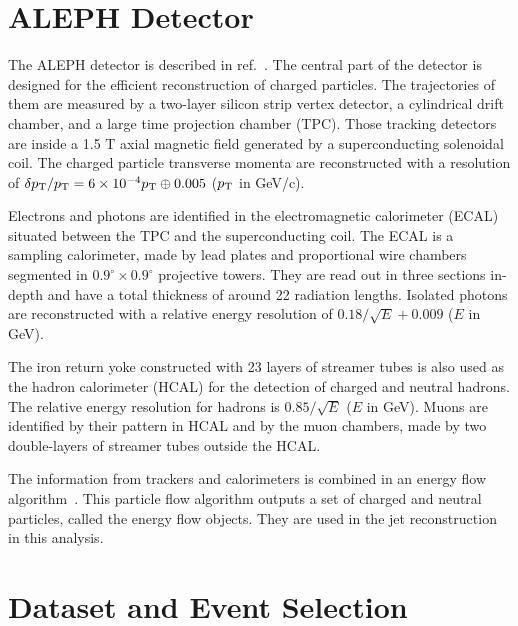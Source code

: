 \documentclass[aps,preprint,superscriptaddress,groupedaddress]{revtex4}  %
\begin{document}
\section{\label{Section:ALEPH}ALEPH Detector}

The ALEPH detector is described in ref.~\cite{Decamp:1990jra}. The central part of the detector is designed for the efficient reconstruction of charged particles. The trajectories of them are measured by a two-layer silicon strip vertex detector, a cylindrical drift chamber, and a large time projection chamber (TPC). Those tracking detectors are inside a 1.5 T axial magnetic field generated by a superconducting solenoidal coil. The charged particle transverse momenta are reconstructed with a resolution of $\delta p_{\rm T}/p_{\rm T} = 6\times 10^{-4} p_{\rm T} \oplus 0.005$ ($p_{\rm T}$ in GeV/c). 

Electrons and photons are identified in the electromagnetic calorimeter (ECAL) situated between the TPC and the superconducting coil. The ECAL is a sampling calorimeter, made by lead plates and proportional wire chambers segmented in $0.9^\circ\times 0.9^\circ$ projective towers. They are read out in three sections in-depth and have a total thickness of around 22 radiation lengths. Isolated photons are reconstructed with a relative energy resolution of $0.18/\sqrt{E}+0.009$ ($E$ in GeV).

The iron return yoke constructed with 23 layers of streamer tubes is also used as the hadron calorimeter (HCAL) for the detection of charged and neutral hadrons. The relative energy resolution for hadrons is $0.85/\sqrt{E}$ ($E$ in GeV). Muons are identified by their pattern in HCAL and by the muon chambers, made by two double-layers of streamer tubes outside the HCAL. 

The information from trackers and calorimeters is combined in an energy flow algorithm~\cite{ALEPH:1994ayc}. This particle flow algorithm outputs a set of charged and neutral particles, called the energy flow objects. They are used in the jet reconstruction in this analysis.

\section{\label{Section:EventSelection}Dataset and Event Selection}
\end{document}
